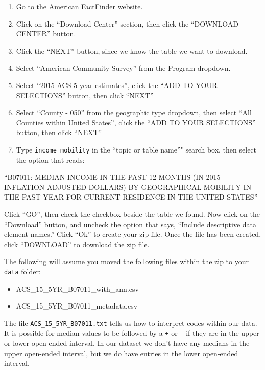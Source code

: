 \documentclass[]{book}
\providecommand{\tightlist}{%
  \setlength{\itemsep}{0pt}\setlength{\parskip}{0pt}}
\theoremstyle{definition}
\theoremstyle{definition}
\theoremstyle{remark}
\begin{document}
\begin{enumerate}
\def\labelenumi{\arabic{enumi}.}
\tightlist
\item
  Go to the \href{https://factfinder.census.gov/}{American FactFinder
  website}.
\item
  Click on the ``Download Center'' section, then click the ``DOWNLOAD
  CENTER'' button.
\item
  Click the ``NEXT'' button, since we know the table we want to
  download.
\item
  Select ``American Community Survey'' from the Program dropdown.
\item
  Select ``2015 ACS 5-year estimates'', click the ``ADD TO YOUR
  SELECTIONS'' button, then click ``NEXT''
\item
  Select ``County - 050'' from the geographic type dropdown, then select
  ``All Counties within United States'', click the ``ADD TO YOUR
  SELECTIONS'' button, then click ``NEXT''
\item
  Type \texttt{income\ mobility} in the ``topic or table name''" search
  box, then select the option that reads:
\end{enumerate}

``B07011: MEDIAN INCOME IN THE PAST 12 MONTHS (IN 2015
INFLATION-ADJUSTED DOLLARS) BY GEOGRAPHICAL MOBILITY IN THE PAST YEAR
FOR CURRENT RESIDENCE IN THE UNITED STATES''

Click ``GO'', then check the checkbox beside the table we found. Now
click on the ``Download'' button, and uncheck the option that says,
``Include descriptive data element names.'' Click ``Ok'' to create your
zip file. Once the file has been created, click ``DOWNLOAD'' to download
the zip file.

The following will assume you moved the following files within the zip
to your \texttt{data} folder:

\begin{itemize}
\tightlist
\item
  ACS\_15\_5YR\_B07011\_with\_ann.csv
\item
  ACS\_15\_5YR\_B07011\_metadata.csv
\end{itemize}

The file \texttt{ACS\_15\_5YR\_B07011.txt} tells us how to interpret
codes within our data. It is possible for median values to be followed
by a \texttt{+} or \texttt{-} if they are in the upper or lower
open-ended interval. In our dataset we don't have any medians in the
upper open-ended interval, but we do have entries in the lower
open-ended interval.
\end{document}
